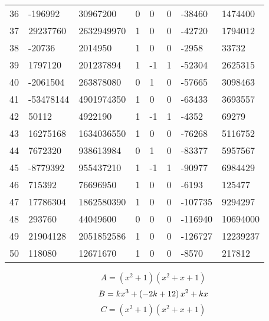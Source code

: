 \documentclass{amsart}
\begin{document}
\begin{longtable}{|l|l|l|lllll|}
36&-196992&30967200&0&0&0&-38460&1474400\\
37&29237760&2632949970&1&0&0&-42720&1794012\\
38&-20736&2014950&1&0&0&-2958&33732\\
39&1797120&201237894&1&-1&1&-52304&2625315\\
40&-2061504&263878080&0&1&0&-57665&3098463\\
41&-53478144&4901974350&1&0&0&-63433&3693557\\
42&50112&4922190&1&-1&1&-4352&69279\\
43&16275168&1634036550&1&0&0&-76268&5116752\\
44&7672320&938613984&0&1&0&-83377&5957567\\
45&-8779392&955437210&1&-1&1&-90977&6984429\\
46&715392&76696950&1&0&0&-6193&125477\\
47&17786304&1862580390&1&0&0&-107735&9294297\\
48&293760&44049600&0&0&0&-116940&10694000\\
49&21904128&2051852586&1&0&0&-126727&12239237\\
50&118080&12671670&1&0&0&-8570&217812\\
\hline
\end{longtable}
$$A=(x^2
 + 1)(x^2
 + x
 + 1)$$
$$B=k\*x^3
 + \left(-2\*k
 + 12\right) \*x^2
 + k\*x$$
$$C=(x^2
 + 1)(x^2
 + x
 + 1)$$
\end{document}
